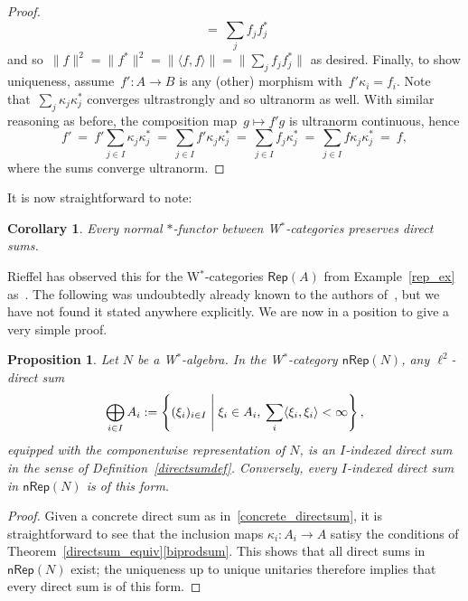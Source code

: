 \documentclass[reqno,T1,11pt]{amsproc}
\newcommand{\beq}{\begin{equation}}
\newcommand{\eeq}{\end{equation}}
\newcommand{\Rep}[1]{\mathsf{Rep}(#1)}		%
\newcommand{\NRep}[1]{\mathsf{nRep}(#1)}	%
\theoremstyle{plain}
\newtheorem{prop}[thm]{Proposition}
\newtheorem{cor}[thm]{Corollary}
\theoremstyle{remark}
\numberwithin{equation}{section}
\begin{document}
\begin{proof}
\begin{equation*}
        \ = \ \sum_j f_j f_j^*
 \end{equation*}
and so~$\| f \|^2 = \|f^*\|^2 = \|\langle f,f \rangle \|
                = \|\sum_j f_j f_j^* \|$ as desired.
Finally, to show uniqueness,
    assume~$f'\colon A \to B$ is any (other)
    morphism with~$f' \kappa_i = f_i$.
    Note that~$\sum_j \kappa_j \kappa_j^*$
       converges ultrastrongly
       and so ultranorm as well.
With similar reasoning as before,
        the composition map~$g \mapsto f' g$ is ultranorm continuous,
        hence
\begin{equation*}
    f'
    \ =\ f' \sum_{j \in I} \kappa_j \kappa_j^*
    \ =\ \sum_{j \in I} f' \kappa_j \kappa_j^*
    \ =\ \sum_{j \in I} f_j \kappa_j^*
    \ =\ \sum_{j \in I} f \kappa_j \kappa_j^*
    \ =\ f,
\end{equation*}
    where the sums converge ultranorm.
\end{proof}

It is now straightforward to note:

\begin{cor}
Every normal $*$-functor between W$^*$-categories preserves direct sums.
\end{cor}

Rieffel has observed this for the W$^*$-categories $\Rep{A}$ from Example~\ref{rep_ex} as~\cite[Proposition~4.9]{Rieffel1974}. The following was undoubtedly already known to the authors of~\cite{wstarcat}, but we have not found it stated anywhere explicitly. We are now in a position to give a very simple proof.

\begin{prop}
Let $N$ be a W$^*$-algebra. In the W$^*$-category $\NRep{N}$, any $\ell^2$-direct sum
\beq
\label{concrete_directsum}
	\bigoplus_{i\in I} A_i := \left\{ (\xi_i)_{i\in I} \Biggm \vert \xi_i\in A_i,\: \sum_i \langle\xi_i,\xi_i\rangle < \infty \right\},
\eeq
equipped with the componentwise representation of $N$, is an \emph{$I$-indexed direct sum} in the sense of Definition~\ref{directsumdef}. Conversely, every $I$-indexed direct sum in $\NRep{N}$ is of this form.
\end{prop}

\begin{proof}
	Given a concrete direct sum as in~\eqref{concrete_directsum}, it is straightforward to see that the inclusion maps $\kappa_i : A_i \to A$ satisy the conditions of Theorem~\ref{directsum_equiv}\ref{biprodsum}. This shows that all direct sums in $\NRep{N}$ exist; the uniqueness up to unique unitaries therefore implies that every direct sum is of this form.
\end{proof}





\end{document}
